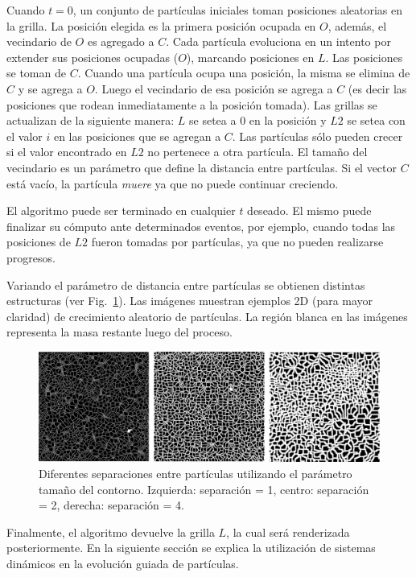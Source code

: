 \documentclass[oneside,a4paper,spanish,links]{amca}
\begin{document}
Cuando $t = 0$, un conjunto de part\'iculas iniciales toman posiciones aleatorias en la grilla. La posici\'on elegida es la primera posici\'on ocupada en $O$, adem\'as, el vecindario de $O$ es agregado a $C$. Cada part\'icula evoluciona en un intento por extender sus posiciones ocupadas ($O$), marcando posiciones en $L$. Las posiciones se toman de $C$. Cuando una part\'icula ocupa una posici\'on, la misma se elimina de $C$ y se agrega a $O$. Luego el vecindario de esa posici\'on se agrega a $C$ (es decir las posiciones que rodean inmediatamente a la posici\'on tomada). Las grillas se actualizan de la siguiente manera: $L$ se setea a $0$ en la posici\'on y $L2$ se setea con el valor $i$ en las posiciones que se agregan a $C$. Las part\'iculas s\'olo pueden crecer si el valor encontrado en $L2$ no pertenece a otra part\'icula. El tama\~no del vecindario es un par\'ametro que define la distancia entre part\'iculas. Si el vector $C$ est\'a vac\'io, la part\'icula {\em muere} ya que no puede continuar creciendo.

El algoritmo puede ser terminado en cualquier $t$ deseado. El mismo puede finalizar su c\'omputo ante determinados eventos, por ejemplo, cuando todas las posiciones de $L2$ fueron tomadas por part\'iculas, ya que no pueden realizarse progresos.

Variando el par\'ametro de distancia entre part\'iculas se obtienen distintas estructuras (ver Fig.~\ref{fg:fig1}). Las im\'agenes muestran ejemplos 2D (para mayor claridad) de crecimiento aleatorio de part\'iculas. La regi\'on blanca en las im\'agenes representa la masa restante luego del proceso.


\begin{figure}[htb!]
  \centerline{\includegraphics[scale=0.22]{fig1.pdf}}
  \caption{Diferentes separaciones entre part\'iculas utilizando el par\'ametro tama\~no del contorno. Izquierda: separaci\'on = 1, centro: separaci\'on = 2, derecha: separaci\'on = 4.}
  \label{fg:fig1}
\end{figure}

Finalmente, el algoritmo devuelve la grilla $L$, la cual ser\'a renderizada posteriormente. En la siguiente secci\'on se explica la utilizaci\'on de sistemas din\'amicos en la evoluci\'on guiada de part\'iculas.
\end{document}
